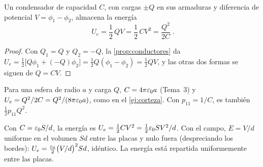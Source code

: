 \begin{corolario}\label{cor:condensador}
Un condensador de capacidad $C$, con cargas $\pm Q$ en sus armaduras y diferencia de potencial $V=\phi_1-\phi_2$, almacena la energía
\begin{equation}\label{eq:condensador}
  \boxed{\;U_e=\frac12\,QV=\frac12\,CV^2=\frac{Q^2}{2C}\;}.
\end{equation}
\end{corolario}

\begin{proof}
Con $Q_1=Q$ y $Q_2=-Q$, la \cref{prop:conductores} da $U_e=\frac12\big[Q\phi_1+(-Q)\phi_2\big]=\frac12Q(\phi_1-\phi_2)=\frac12QV$, y las otras dos formas se
siguen de $Q=CV$.
\end{proof}

\begin{ejemplo}\label{ej:esfera-aislada}
Para una esfera de radio $a$ y carga $Q$, $C=4\pi\varepsilon_0 a$ (Tema~3) y $U_e=Q^2/2C=Q^2/(8\pi\varepsilon_0 a)$, como en el \cref{ej:corteza}. Con $p_{11}=1/C$, es
también $\frac12p_{11}Q^2$.
\end{ejemplo}

\begin{ejemplo}\label{ej:plano}
Con $C=\varepsilon_0 S/d$, la energía es $U_e=\frac12CV^2=\frac12\varepsilon_0 SV^2/d$. Con el campo, $E=V/d$ uniforme en el volumen $Sd$ entre las placas y nulo
fuera (despreciando los bordes): $U_e=\frac{\varepsilon_0}{2}\big(V/d\big)^2Sd$, idéntico. La energía está repartida uniformemente entre las placas.
\end{ejemplo}
